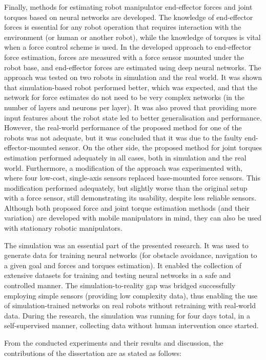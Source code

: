 Finally, methods for estimating robot manipulator end-effector forces and joint torques based on neural networks are developed. The knowledge of end-effector forces is essential for any robot operation that requires interaction with the environment (or human or another robot), while the knowledge of torques is vital when a force control scheme is used. In the developed approach to end-effector force estimation, forces are measured with a force sensor mounted under the robot base, and end-effector forces are estimated using deep neural networks. The approach was tested on two robots in simulation and the real world. It was shown that simulation-based robot performed better, which was expected, and that the network for force estimates do not need to be very complex networks (in the number of layers and neurons per layer). It was also proved that providing more input features about the robot state led to better generalisation and performance. However, the real-world performance of the proposed method for one of the robots was not adequate, but it was concluded that it was due to the faulty end-effector-mounted sensor. On the other side, the proposed method for joint torques estimation performed adequately in all cases, both in simulation and the real world. Furthermore, a modification of the approach was experimented with, where four low-cost, single-axis sensors replaced base-mounted force sensors. This modification performed adequately, but slightly worse than the original setup with a force sensor, still demonstrating its usability, despite less reliable sensors. Although both proposed force and joint torque estimation methods (and their variation) are developed with mobile manipulators in mind, they can also be used with stationary robotic manipulators.

The simulation was an essential part of the presented research. It was used to generate data for training neural networks (for obstacle avoidance, navigation to a given goal and forces and torques estimation). It enabled the collection of extensive datasets for training and testing neural networks in a safe and controlled manner. The simulation-to-reality gap was bridged successfully employing simple sensors (providing low complexity data),  thus enabling the use of simulation-trained networks on real robots without retraining with real-world data. During the research, the simulation was running for four days total, in a self-supervised manner, collecting data without human intervention once started.

From the conducted experiments and their results and discussion, the contributions of the dissertation are as stated as follows:

